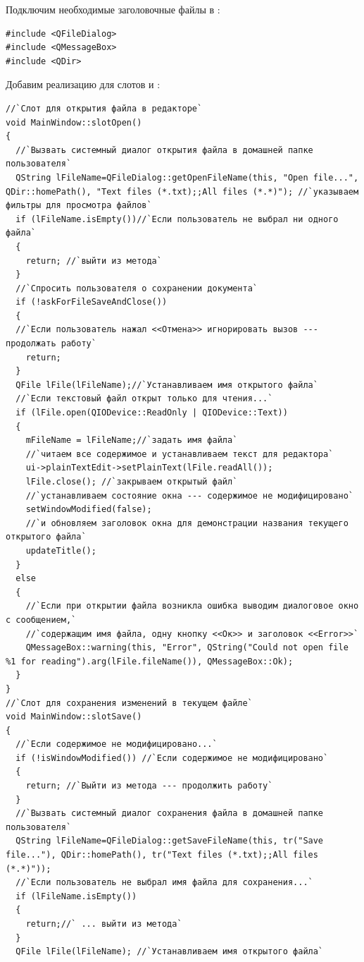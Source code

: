 Подключим необходимые заголовочные файлы в : 
\begin{lstlisting}
#include <QFileDialog>
#include <QMessageBox>
#include <QDir>
\end{lstlisting}

Добавим реализацию для слотов  и : 
\begin{lstlisting}
//`Слот для открытия файла в редакторе` 
void MainWindow::slotOpen()
{
  //`Вызвать системный диалог открытия файла в домашней папке пользователя` 
  QString lFileName=QFileDialog::getOpenFileName(this, "Open file...", QDir::homePath(), "Text files (*.txt);;All files (*.*)"); //`указываем фильтры для просмотра файлов` 
  if (lFileName.isEmpty())//`Если пользователь не выбрал ни одного файла`
  {
    return; //`выйти из метода`
  }
  //`Спросить пользователя о сохранении документа`
  if (!askForFileSaveAndClose())
  {
  //`Если пользователь нажал <<Отмена>> игнорировать вызов --- продолжать работу`
    return;
  }
  QFile lFile(lFileName);//`Устанавливаем имя открытого файла`
  //`Если текстовый файл открыт только для чтения...` 
  if (lFile.open(QIODevice::ReadOnly | QIODevice::Text))
  {
    mFileName = lFileName;//`задать имя файла`
    //`читаем все содержимое и устанавливаем текст для редактора`
    ui->plainTextEdit->setPlainText(lFile.readAll());
    lFile.close(); //`закрываем открытый файл`
    //`устанавливаем состояние окна --- содержимое не модифицировано`
    setWindowModified(false);
    //`и обновляем заголовок окна для демонстрации названия текущего открытого файла` 
    updateTitle();
  }
  else
  {
    //`Если при открытии файла возникла ошибка выводим диалоговое окно с сообщением,` 
    //`содержащим имя файла, одну кнопку <<Ок>> и заголовок <<Error>>` 
    QMessageBox::warning(this, "Error", QString("Could not open file %1 for reading").arg(lFile.fileName()), QMessageBox::Ok);
  }
}
//`Слот для сохранения изменений в текущем файле` 
void MainWindow::slotSave()
{
  //`Если содержимое не модифицировано...`
  if (!isWindowModified()) //`Если содержимое не модифицировано`
  {
    return; //`Выйти из метода --- продолжить работу`
  }
  //`Вызвать системный диалог сохранения файла в домашней папке пользователя`
  QString lFileName=QFileDialog::getSaveFileName(this, tr("Save file..."), QDir::homePath(), tr("Text files (*.txt);;All files (*.*)"));
  //`Если пользователь не выбрал имя файла для сохранения...`
  if (lFileName.isEmpty())
  {
    return;//` ... выйти из метода`
  }
  QFile lFile(lFileName); //`Устанавливаем имя открытого файла` 

\end{lstlisting}
